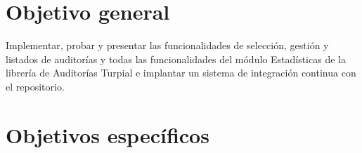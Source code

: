 \section{Objetivo general}

Implementar, probar y presentar las funcionalidades de selección, gestión y
listados de auditorías y todas las funcionalidades del módulo Estadísticas de
la librería de Auditorías Turpial e implantar un sistema de integración
continua con el repositorio.

\section{Objetivos específicos}
